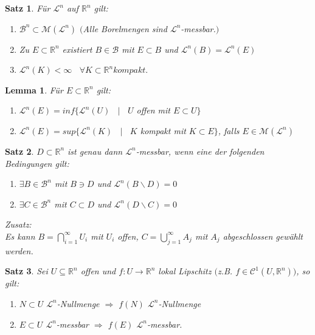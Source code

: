 \documentclass[11pt]{memoir}
\theoremstyle{changebreak}
\newtheorem{Lemma}{Lemma}[chapter]
\newtheorem{Satz}{Satz}[chapter]
\begin{document}
\begin{Satz}
	Für $\mathscr{L}^n$ auf $\mathbb{R}^n$ gilt:
	\begin{enumerate}
		\item $\mathscr{B}^n \subset \mathscr{M}(\mathscr{L}^n)$ $($Alle Borelmengen sind $\mathscr{L}^n$-messbar.$)$
		\item Zu $E \subset \mathbb{R}^n$ existiert $B \in \mathscr{B}$ mit $E \subset B$
			und $\mathscr{L}^n(B) = \mathscr{L}^n(E)$
		\item $\mathscr{L}^n(K) < \infty$ \, $\forall K \subset \mathbb{R}^n kompakt.$
	\end{enumerate}
\end{Satz}

\begin{Lemma}
	Für $E \subset \mathbb{R}^n$ gilt:
	\begin{enumerate}
		\item $\mathscr{L}^n(E) = inf\{\mathscr{L}^n(U) $ \, $|$ \, $U$ offen mit $E \subset{U}\}$
		\item $\mathscr{L}^n(E) = sup\{\mathscr{L}^n(K) $ \, $|$ \, $K$ kompakt mit $K \subset{E}\}$,
			falls $E \in \mathscr{M}(\mathscr{L}^n)$
	\end{enumerate}
\end{Lemma}

\begin{Satz}
	$D \subset \mathbb{R}^n$ ist genau dann $\mathscr{L}^n$-messbar, wenn eine der folgenden Bedingungen gilt:
	\begin{enumerate}
		\item $\exists B \in \mathscr{B}^n$ mit $B \ni D$ und $\mathscr{L}^n(B \backslash D) = 0$
		\item $\exists C \in \mathscr{B}^n$ mit $C \subset D$ und $\mathscr{L}^n(D \backslash C) = 0$
	\end{enumerate}
	\textit{Zusatz:}\\
	Es kann $B = \bigcap\limits_{i = 1}^\infty U_i$ mit $U_i$ offen, $C = \bigcup\limits_{j = 1}^\infty A_j$ mit $A_j$
	abgeschlossen gewählt werden.
\end{Satz}


\newpage



\begin{Satz}
Sei $U \subseteq \mathbb R^n$ offen und $f: U \rightarrow \mathbb R^n$ lokal Lipschitz $($z.B. $f \in \mathscr C^1(U, \mathbb R^n))$, so gilt:
\begin{enumerate}
	\item $N \subset U$ $\mathscr L^n$-Nullmenge $\Rightarrow$ $f(N)$ $\mathscr L^n$-Nullmenge
	\item $E \subset U$ $\mathscr L^n$-messbar $\Rightarrow$ $f(E)$ $\mathscr L^n$-messbar.
\end{enumerate}
\end{Satz}
\end{document}
